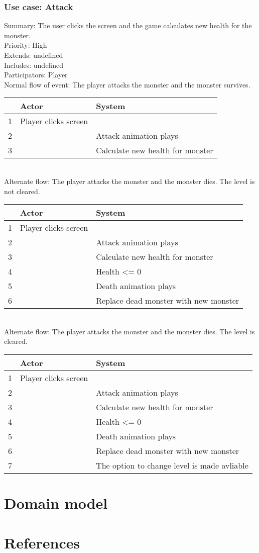 \documentclass{article}
\begin{document}
\subsubsection{Use case: Attack}
Summary: The user clicks the screen and the game calculates new health for the monster.\\
Priority: High\\
Extends: undefined\\
Includes: undefined\\
Participators: Player\\
Normal flow of event: The player attacks the monster and the monster survives.
\begin{tabular}{| c | l | l |} \hline
    & Actor & System \\ \hline
    1 & Player clicks screen & \\ \hline
    2 & & Attack animation plays \\ \hline
    3 & & Calculate new health for monster\\ \hline
\end{tabular}\\
Alternate flow: The player attacks the monster and the monster dies. The level is not cleared.\\
\begin{tabular}{| c | l | l |} \hline
    & Actor & System \\ \hline
    1 & Player clicks screen & \\ \hline
    2 & & Attack animation plays \\ \hline
    3 & & Calculate new health for monster\\ \hline
    4 & & Health <= 0 \\ \hline
    5 & & Death animation plays \\ \hline 
    6 & & Replace dead monster with new monster \\ \hline
\end{tabular}\\
Alternate flow: The player attacks the monster and the monster dies. The level is cleared.\\
\begin{tabular}{| c | l | l |} \hline
    & Actor & System \\ \hline
    1 & Player clicks screen & \\ \hline
    2 & & Attack animation plays \\ \hline
    3 & & Calculate new health for monster\\ \hline
    4 & & Health <= 0 \\ \hline
    5 & & Death animation plays \\ \hline 
    6 & & Replace dead monster with new monster \\ \hline
    7 & & The option to change level is made avliable\\ \hline
\end{tabular}

\section{Domain model}

\section{References}
\end{document}
